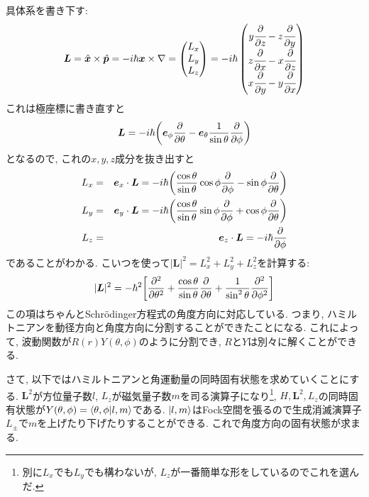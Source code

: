 \documentclass[10.5pt,a4paper]{jreport}
\newcommand{\bx}{\bm{x}}
\begin{document}
具体系を書き下す:
\begin{eqnarray}
  \bm{L} =\hat{\bm{x}}\times\hat{\bm{p}} = -i\hbar\bx\times\nabla =
  \begin{pmatrix}
    L_x\\
    L_y\\
    L_z
  \end{pmatrix}
  = -i\hbar
  \begin{pmatrix}
    y\cfrac{\partial}{\partial z} - z\cfrac{\partial}{\partial y}\\
    z\cfrac{\partial}{\partial x} - x\cfrac{\partial}{\partial z}\\
    x\cfrac{\partial}{\partial y} - y\cfrac{\partial}{\partial x}
  \end{pmatrix}
\end{eqnarray}
これは極座標に書き直すと
\begin{eqnarray}
  \bm{L} = -i\hbar\qty(\bm{e}_\phi\frac{\partial}{\partial \theta} - \bm{e}_\theta\frac{1}{\sin{\theta}}\frac{\partial}{\partial\phi})
\end{eqnarray}
となるので, これの$x, y, z$成分を抜き出すと
\begin{eqnarray}
  L_x &=& \bm{e}_x\cdot\bm{L} = -i\hbar\qty(\frac{\cos{\theta}}{\sin{\theta}}\cos{\phi}\frac{\partial}{\partial\phi} - \sin{\phi}\frac{\partial}{\partial\theta})\\
  L_y &=& \bm{e}_y\cdot\bm{L} = -i\hbar\qty(\frac{\cos{\theta}}{\sin{\theta}}\sin{\phi}\frac{\partial}{\partial\phi} + \cos{\phi}\frac{\partial}{\partial\theta})\\
  L_z &=& \bm{e}_z\cdot\bm{L} = -i\hbar\frac{\partial}{\partial\phi}
\end{eqnarray}
であることがわかる. こいつを使って$|\bm{L}|^2 = L_x^2 + L_y^2 + L_z^2$を計算する:
\begin{eqnarray}
  |\bm{L}|^2 = -\hbar^2\qty[\frac{\partial^2}{\partial\theta^2} + \frac{\cos{\theta}}{\sin{\theta}}\frac{\partial}{\partial\theta} + \frac{1}{\sin^2{\theta}}\frac{\partial^2}{\partial\phi^2}]
\end{eqnarray}
この項はちゃんとSchr\"odinger方程式の角度方向に対応している. つまり, ハミルトニアンを動径方向と角度方向に分割することができたことになる. これによって, 波動関数が$R(r)Y(\theta, \phi)$のように分割でき, $R$と$Y$は別々に解くことができる.

さて, 以下ではハミルトニアンと角運動量の同時固有状態を求めていくことにする. $\bm{L}^2$が方位量子数$l$, $L_z$が磁気量子数$m$を司る演算子になり\footnote{別に$L_x$でも$L_y$でも構わないが, $L_z$が一番簡単な形をしているのでこれを選んだ. }, $H, \bm{L}^2, L_z$の同時固有状態が$Y(\theta, \phi) = \bra{\theta, \phi}\ket{l, m}$である. $\ket{l, m}$はFock空間を張るので生成消滅演算子$L_{\pm}$で$m$を上げたり下げたりすることができる. これで角度方向の固有状態が求まる.
\end{document}
